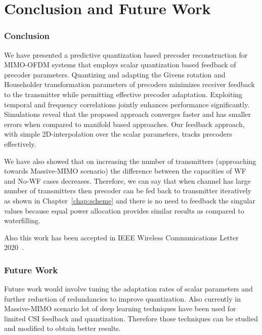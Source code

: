 \documentclass[11pt,a4paper]{report}
\begin{document}
\chapter{Conclusion and Future Work}
\subsection{Conclusion}
We have presented a predictive quantization based precoder
reconstruction for MIMO-OFDM systems that employs scalar quantization
based feedback of precoder parameters. Quantizing and adapting the
Givens rotation and Householder transformation parameters of precoders
minimizes receiver feedback to the transmitter while permitting
effective precoder adaptation. Exploiting temporal and frequency
correlations jointly enhances performance significantly. Simulations
reveal that the proposed approach converges faster and has smaller
errors when compared to manifold based approaches. Our feedback
approach, with simple 2D-interpolation over the scalar parameters,
tracks precoders effectively.

We have also showed that on increasing the number of transmitters (approaching towards Massive-MIMO scenario)
the difference between the capacities of WF and No-WF cases decreases.
Therefore, we can say that when channel has large number of transmitters
then precoder can be fed back to transmitter iteratively as shown in Chapter~\ref{chap:scheme}
and there is no need to feedback the singular values because equal power 
allocation provides similar results as compared to waterfilling.

Also this work has been accepted in IEEE Wireless Communications Letter 2020~\cite{9099894}.

\subsection{Future Work}
Future work would involve tuning the adaptation rates of scalar 
parameters and further reduction of redundancies to improve quantization.
Also currently in Massive-MIMO scenario lot of deep learning techniques have been 
used for limited CSI feedback and quantization. Therefore those techniques
can be studied and modified to obtain better results.


\end{document}
